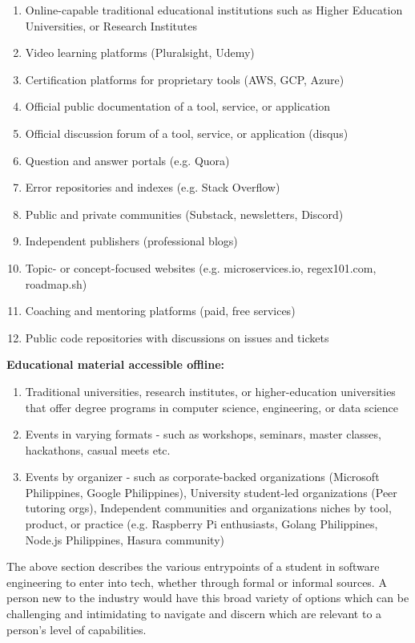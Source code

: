 \documentclass[journal, onecolumn]{IEEEtran}
\begin{document}
\begin{enumerate}
  \item Online-capable traditional educational institutions such as Higher Education Universities, or Research Institutes
  \item Video learning platforms (Pluralsight, Udemy)
  \item Certification platforms for proprietary tools (AWS, GCP, Azure)
  \item Official public documentation of a tool, service, or application
  \item Official discussion forum of a tool, service, or application (disqus)
  \item Question and answer portals (e.g. Quora) 
  \item Error repositories and indexes (e.g. Stack Overflow)
  \item Public and private communities (Substack, newsletters, Discord)
  \item Independent publishers (professional blogs)
  \item Topic- or concept-focused websites (e.g. microservices.io, regex101.com, roadmap.sh)
  \item Coaching and mentoring platforms (paid, free services)
  \item Public code repositories with discussions on issues and tickets
\end{enumerate}

\textbf{Educational material accessible offline:}

\begin{enumerate}
  \item Traditional universities, research institutes, or higher-education 
  universities that offer degree programs in computer science, engineering,
  or data science
  \item Events in varying formats - such as workshops, seminars, master classes, hackathons, casual meets etc.
  \item Events by organizer - such as corporate-backed organizations 
  (Microsoft Philippines, Google Philippines), University student-led organizations (Peer tutoring orgs), 
  Independent communities and organizations niches by tool, product, or practice 
  (e.g. Raspberry Pi enthusiasts, Golang Philippines, Node.js Philippines, Hasura community)
\end{enumerate}

The above section describes the various entrypoints of a student in software engineering
to enter into tech, whether through formal or informal sources. A person new to the industry
would have this broad variety of options which can be challenging and intimidating to 
navigate and discern which are relevant to a person's level of capabilities. 
\end{document}
